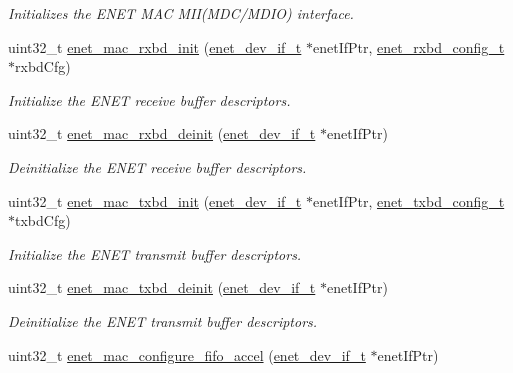 \begin{DoxyCompactItemize}
\begin{DoxyCompactList}\small\item\em Initializes the E\+N\+ET M\+AC M\+II(M\+D\+C/\+M\+D\+IO) interface. \end{DoxyCompactList}\item 
uint32\+\_\+t \hyperlink{group__enet__driver_gae91ff1df7b6170a9957d51c2ff869960}{enet\+\_\+mac\+\_\+rxbd\+\_\+init} (\hyperlink{group__enet__driver_ga497f30fbc93952e93d9fb8cf78480b75}{enet\+\_\+dev\+\_\+if\+\_\+t} $\ast$enet\+If\+Ptr, \hyperlink{group__enet__driver_gab090bee9d2d43fafd258c5cf9db43405}{enet\+\_\+rxbd\+\_\+config\+\_\+t} $\ast$rxbd\+Cfg)
\begin{DoxyCompactList}\small\item\em Initialize the E\+N\+ET receive buffer descriptors. \end{DoxyCompactList}\item 
uint32\+\_\+t \hyperlink{group__enet__driver_ga5d14bb29fd8981045732b6a8e37cab6c}{enet\+\_\+mac\+\_\+rxbd\+\_\+deinit} (\hyperlink{group__enet__driver_ga497f30fbc93952e93d9fb8cf78480b75}{enet\+\_\+dev\+\_\+if\+\_\+t} $\ast$enet\+If\+Ptr)
\begin{DoxyCompactList}\small\item\em Deinitialize the E\+N\+ET receive buffer descriptors. \end{DoxyCompactList}\item 
uint32\+\_\+t \hyperlink{group__enet__driver_gaea6872d6cf621b18377e1bed63d34840}{enet\+\_\+mac\+\_\+txbd\+\_\+init} (\hyperlink{group__enet__driver_ga497f30fbc93952e93d9fb8cf78480b75}{enet\+\_\+dev\+\_\+if\+\_\+t} $\ast$enet\+If\+Ptr, \hyperlink{group__enet__driver_gaa9b0e870936a3a951241a0d2d95e22cd}{enet\+\_\+txbd\+\_\+config\+\_\+t} $\ast$txbd\+Cfg)
\begin{DoxyCompactList}\small\item\em Initialize the E\+N\+ET transmit buffer descriptors. \end{DoxyCompactList}\item 
uint32\+\_\+t \hyperlink{group__enet__driver_ga82de147b2f11f27741e60c7240352fca}{enet\+\_\+mac\+\_\+txbd\+\_\+deinit} (\hyperlink{group__enet__driver_ga497f30fbc93952e93d9fb8cf78480b75}{enet\+\_\+dev\+\_\+if\+\_\+t} $\ast$enet\+If\+Ptr)
\begin{DoxyCompactList}\small\item\em Deinitialize the E\+N\+ET transmit buffer descriptors. \end{DoxyCompactList}\item 
uint32\+\_\+t \hyperlink{group__enet__driver_gafda76231ac24becaa96c5883d823fc93}{enet\+\_\+mac\+\_\+configure\+\_\+fifo\+\_\+accel} (\hyperlink{group__enet__driver_ga497f30fbc93952e93d9fb8cf78480b75}{enet\+\_\+dev\+\_\+if\+\_\+t} $\ast$enet\+If\+Ptr)

\end{DoxyCompactItemize}
